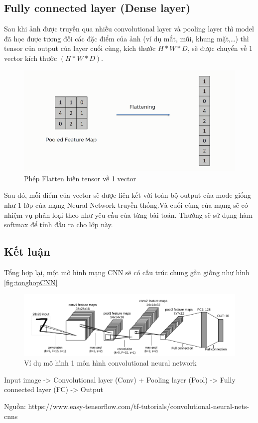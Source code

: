 \subsection{Fully connected layer (Dense layer)}
\label{ss:dense}
Sau khi ảnh được truyền qua nhiều convolutional layer và pooling layer thì model đã học được tương đối các đặc điểm của ảnh (ví dụ mắt, mũi, khung mặt,…) thì tensor của output của layer cuối cùng, kích thước $H*W*D$, sẽ được chuyển về 1 vector kích thước $(H*W*D)$.

\FloatBarrier
\begin{figure}[htp]
\begin{center}
\includegraphics[scale=1]{chap2/c2_figs/17.png}
\end{center}
\caption{Phép Flatten biến tensor về 1 vector}
\label{fig:flatten}
\end{figure}
\FloatBarrier
Sau đó, mỗi điểm của vector sẽ được liên kết với toàn bộ output của mode giống như 1 lớp của mạng Neural Network truyền thống.Và cuối cùng của mạng sẽ có nhiệm vụ phân loại theo như yêu cầu của từng bài toán. Thường sẽ sử dụng hàm softmax để tính đầu ra cho lớp này.




\subsection{Kết luận}
Tổng hợp lại, một mô hình mạng CNN sẽ có cấu trúc chung gần giống như hình \ref{fig:tonghopCNN}

\FloatBarrier
\begin{figure}[htp]
\begin{center}
\includegraphics[scale=1]{chap2/c2_figs/18.png}
\end{center}
\caption{Ví dụ mô hình 1 môn hình convolutional neural network}
\label{fig:flatten}
\end{figure}
\FloatBarrier
\centerline{Input image -> Convolutional layer (Conv) + Pooling layer (Pool) -> Fully connected layer (FC) -> Output}
\centerline{Nguồn: https://www.easy-tensorflow.com/tf-tutorials/convolutional-neural-nets-cnns}